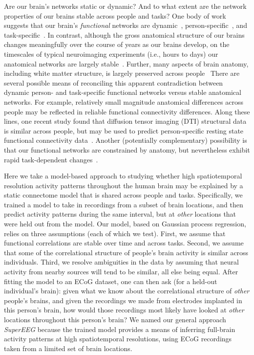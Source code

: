 \documentclass[12pt]{article}
\begin{document}
Are our brain's networks static or dynamic?  And to what extent are the network properties of our brains stable across people and tasks?  One body of work suggests that our brain's \textit{functional} networks are dynamic~\citep[e.g., ][]{MannEtal18}, person-specific~\citep[e.g., ][]{FinnEtal15}, and task-specific~\citep[e.g., ][]{Turk13}.  In contrast, although the gross anatomical structure of our brains changes meaningfully over the course of years as our brains develop, on the timescales of typical neuroimaging experiments (i.e., hours to days) our anatomical networks are largely stable~\citep[e.g., ][]{CaseEtal00}.  Further, many aspects of brain anatomy, including white matter structure, is largely preserved across people~\citep[e.g., ][]{TalaTour88, JahaEtal13, MoriEtal08}  There are several possible means of reconciling this apparent contradiction between dynamic person- and task-specific functional networks versus stable anatomical networks.  For example, relatively small magnitude anatomical differences across people may be reflected in reliable functional connectivity differences.  Along these lines, one recent study found that diffusion tensor imaging (DTI) structural data is similar across people, but may be used to predict person-specific resting state functional connectivity data~\citep{BeckEtal18}.  Another (potentially complementary) possibility is that our functional networks are constrained by anatomy, but nevertheless exhibit rapid task-dependent changes~\citep[e.g., ][]{SporBetz16}.

Here we take a model-based approach to studying whether high spatiotemporal resolution activity patterns throughout the human brain may be explained by a static connectome model that is shared across people and tasks.  Specifically, we trained a model to take in recordings from a subset of brain locations, and then predict activity patterns during the same interval, but at \textit{other} locations that were held out from the model.  Our model, based
on Gaussian process regression, relies on three assumptions (each of which we test).  First, we assume that functional correlations are stable over time and across tasks.  Second, we assume that some of the correlational structure of people's brain activity is similar across individuals.  Third, we resolve
ambiguities in the data by assuming that neural activity from
nearby sources will tend to be similar, all else being equal.  After fitting the model to an ECoG dataset, one
can then ask (for a held-out individual's brain): given what we
know about the correlational structure of \textit{other} people's brains,
and given the recordings we made from electrodes implanted in this
person's brain, how would those recordings most likely have looked
at \textit{other} locations throughout this person's brain?  We named our general approach \textit{SuperEEG} because the trained model provides a means of inferring full-brain activity patterns at high spatiotemporal resolutions, using ECoG recordings taken from a limited set of brain locations.  
\end{document}

